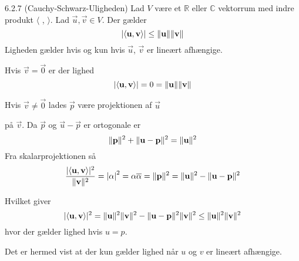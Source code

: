 %
%

\begin{saetning}{6.2.7 (Cauchy-Schwarz-Uligheden)}
	Lad $V$ være et $\mathbb{R}$ eller $\mathbb{C}$ vektorrum med indre produkt
	$\langle$ , $\rangle$. Lad $\vec{u}, \vec{v} \in V$. Der gælder
	\[
		\lvert \langle \mathbf{u}, \mathbf{v} \rangle \rvert \leq \lVert\mathbf{u}\rVert\lVert
		\mathbf{v}\rVert
	\]
	Ligheden gælder hvis og kun hvis $\vec{u}$, $\vec{v}$ er lineært afhængige.
\end{saetning}

\begin{bevis}
	Hvis $\vec{v}=\vec{0}$ er der lighed
	\[
		\lvert \langle \mathbf{u}, \mathbf{v} \rangle \rvert = 0 = \lVert\mathbf{u}\rVert
		\lVert\mathbf{v}\rVert
	\]
	
	Hvis $\vec{v} \not= \vec{0}$ lades $\vec{p}$ være projektionen af $\vec{u}$
	
	på $\vec{v}$. Da $\vec{p}$ og $\vec{u} - \vec{p}$ er ortogonale er
	\[
		\lVert\mathbf{p}\rVert^2 + \lVert\mathbf{u} - \mathbf{p}\rVert^2 = \lVert\mathbf{u}\rVert^2
	\]
	Fra skalarprojektionen så
	\[
		\frac{\lvert \langle \mathbf{u}, \mathbf{v} \rangle \rvert^2}{\lVert\mathbf{v}\rVert^2}
		= {\lvert \alpha \rvert}^2 = \alpha \overline\alpha = \lVert\mathbf{p}\rVert^2
		= \lVert\mathbf{u}\rVert^2 - \lVert\mathbf{u} - \mathbf{p}\rVert^2
	\]
	\begin{center}
	\end{center}
	Hvilket giver
	\[
		\lvert \langle \mathbf{u}, \mathbf{v} \rangle \rvert^2 = \lVert\mathbf{u}\rVert^2
		\lVert\mathbf{v}\rVert^2 - \lVert\mathbf{u} - \mathbf{p}\rVert^2\lVert\mathbf{v}\rVert^2 \leq
		\lVert\mathbf{u}\rVert^2\lVert\mathbf{v}\rVert^2
	\]
	hvor der gælder lighed hvis $u=p$.

	Det er hermed vist at der kun gælder lighed når $u$ og $v$ er lineært
	afhængige.
\end{bevis}
